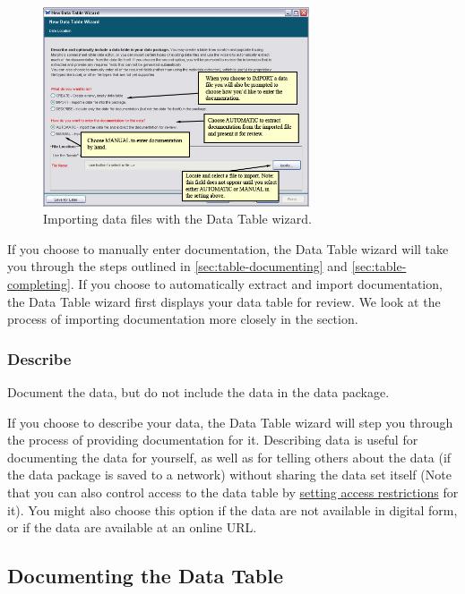 \begin{figure}
  \centering
    \includegraphics[width=0.7\textwidth]{images/wizard-table-import-options.jpg}
  \caption{Importing data files with the Data Table wizard.}
  \label{fig:wizard-table-import-options}
\end{figure}

If you choose to manually enter documentation, the Data Table wizard
will take you through the steps outlined in
\autoref{sec:table-documenting} and \autoref{sec:table-completing}. If
you choose to automatically extract and import documentation, the Data
Table wizard first displays your data table for review. We look at the
process of importing documentation more closely in the
 section.

\subsubsection{Describe} \label{sec:table-describe}

Document the data, but do not include the data in the data package.

If you choose to describe your data, the Data Table wizard will step you
through the process of providing documentation for it. Describing data
is useful for documenting the data for yourself, as well as for telling
others about the data (if the data package is saved to a network)
without sharing the data set itself (Note that you can also control
access to the data table by \hyperref[sec:edit-table-access]{setting
access restrictions} for it). You might also choose this option if the
data are not available in digital form, or if the data are available at
an online URL.

\subsection{Documenting the Data Table} \label{sec:table-documenting}

